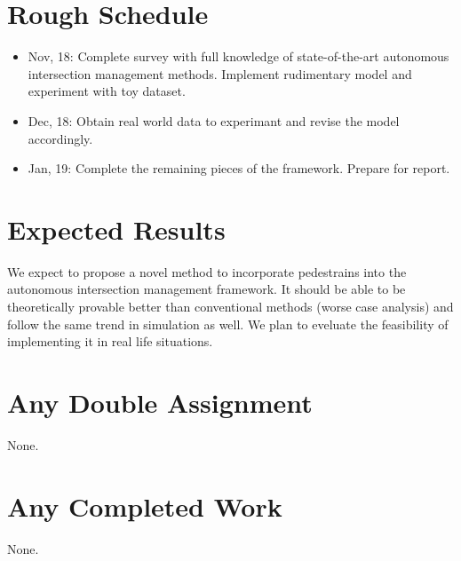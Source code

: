 \documentclass[12pt]{article}
\begin{document}
\section{Rough Schedule}
\begin{itemize}
  \item Nov, 18: Complete survey with full knowledge of state-of-the-art autonomous intersection management methods.
    Implement rudimentary model and experiment with toy dataset.
  \item Dec, 18: Obtain real world data to experimant and revise the model accordingly.
  \item Jan, 19: Complete the remaining pieces of the framework. Prepare for report. 
\end{itemize}
\section{Expected Results}
We expect to propose a novel method to incorporate pedestrains into the autonomous intersection management framework. 
It should be able to be theoretically provable better than conventional methods (worse case analysis) and follow the same trend in simulation as well. 
We plan to eveluate the feasibility of implementing it in real life situations.
\section{Any Double Assignment}
None.
\section{Any Completed Work}
None.
\end{document}
